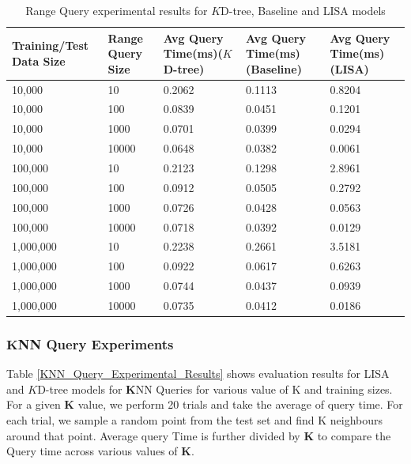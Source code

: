 \begin{table}
	\centering
\centering
	\begin{tabular}{||p{}<{\centering}|p{}<{\centering}|p{}<{\centering}|p{}<{\centering}|p{}<{\centering}||}
		\hline
		Training/Test Data Size& Range Query Size & Avg Query Time(ms)($K$D-tree) & Avg Query Time(ms)(Baseline)&Avg Query Time(ms)(LISA)\\ [0.5ex] 
		\hline
		\hline
	 	10,000& 10& 0.2062 & 0.1113& 0.8204 \\
	 	\hline
	 	10,000& 100& 0.0839 & 0.0451& 0.1201 \\
	 	\hline
	 	10,000& 1000& 0.0701 & 0.0399& 0.0294 \\
 	 	\hline
 	 	10,000& 10000& 0.0648&0.0382&0.0061 \\
	 	\hline
	 	100,000& 10& 0.2123 & 0.1298&2.8961 \\
	 	\hline
	 	100,000& 100& 0.0912 & 0.0505&0.2792 \\
	 	\hline
	 	100,000& 1000& 0.0726 & 0.0428&  0.0563 \\
 	 	\hline
 	 	100,000& 10000&0.0718& 0.0392& 0.0129 \\
	 	\hline
	    1,000,000& 10& 0.2238 & 0.2661& 3.5181 \\
	 	\hline
	 	1,000,000& 100& 0.0922 & 0.0617&0.6263 \\
	 	\hline
	 	1,000,000& 1000& 0.0744 & 0.0437 &0.0939 \\
	 	\hline
	 	1,000,000& 10000& 0.0735 & 0.0412 &0.0186 \\
	 	
	 
		\hline
		\hline
	\end{tabular}
	\caption{Range Query experimental results for $K$D-tree, Baseline and LISA models}
	\label{Range_Query_Experimental_Results}

\end{table}



\subsubsection {$\boldsymbol{K}$NN Query Experiments}
Table \ref{KNN_Query_Experimental_Results} shows evaluation results for LISA and $K$D-tree models for $\boldsymbol{K}$NN Queries for various value of K and training sizes. For a given $\boldsymbol{K}$ value, we perform 20 trials and take the average of query time. For each trial, we sample a random point from the test set and find K neighbours around that point. Average query Time is further divided by $\boldsymbol{K}$ to compare the Query time across various values of $\boldsymbol{K}$.

